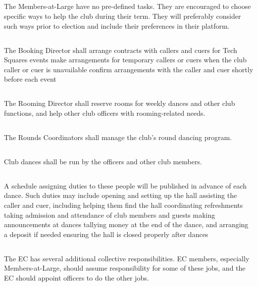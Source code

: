 \documentclass{bylaws}
\begin{document}
\subsection{}The Members-at-Large have no pre-defined tasks. They are encouraged to choose specific ways to help the club during their term. They will preferably consider such ways prior to election and include their preferences in their platform.

\subsection{}The Booking Director shall
\duty arrange contracts with callers and cuers for Tech Squares events
\duty make arrangements for temporary callers or cuers when the club caller or cuer is unavailable
\duty confirm arrangements with the caller and cuer shortly before each event
\subsection{}The Rooming Director shall reserve rooms for weekly dances and other club functions, and help other club officers with rooming-related needs.
\subsection{}The Rounds Coordinators shall manage the club's round dancing program.

\subsection{}Club dances shall be run by the officers and other club members.

\subsection{}A schedule assigning duties to these people will be published in advance of each dance. Such duties may include
\duty opening and setting up the hall
\duty assisting the caller and cuer, including helping them find the hall
\duty coordinating refreshments
\duty taking admission and attendance of club members and guests
\duty making announcements at dances
\duty tallying money at the end of the dance, and arranging a deposit if needed
\duty ensuring the hall is closed properly after dances

\subsection{}The EC has several additional collective responsibilities. EC members, especially Members-at-Large, should assume responsibility for some of these jobs, and the EC should appoint officers to do the other jobs.
\end{document}
